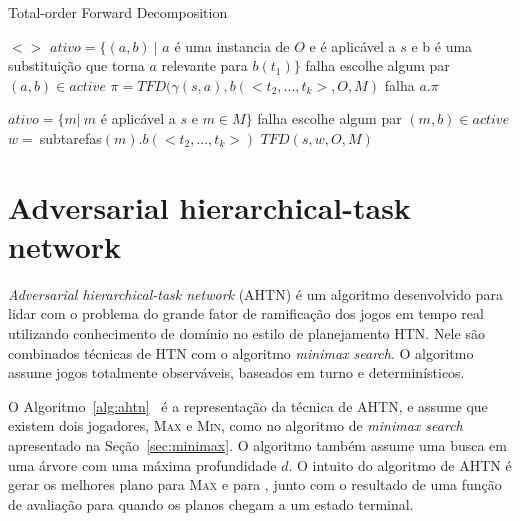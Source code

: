 \begin{algorithm}
	\caption{Total-order Forward Decomposition}
	\label{alg:tfd}
	\begin{algorithmic}[1]		
				\State	\Return $<>$
			\EndIf
				\State $ativo = \{(a, b)~ |$ $a$ é uma instancia de $O$ e é aplicável a $s$ e b é uma substituição que torna $a$ relevante para $b(t_{1})\}$
					\State \Return falha
				\EndIf
				\State escolhe algum par $(a, b) \in active$
				\State $\pi = TFD(\gamma(s, a), b(<t_{2}, ..., t_{k}>, O, M)$
					\State \Return falha
				\Else 
					\State \Return $a . \pi$
			\EndIf
			
				\State $ativo = \{m |~ m$ é aplicável a $s$ e $m \in M\}$
					\State \Return falha
				\EndIf
				\State escolhe algum par $(m, b) \in active$
				\State $w =~ $subtarefas$(m).b(<t_{2}, ..., t_{k}>)$
				\State \Return $TFD(s, w, O, M)$
				\EndIf
		\EndFunction
	\end{algorithmic}
\end{algorithm}

\section{Adversarial hierarchical-task network} 

\textit{Adversarial hierarchical-task network} (AHTN) é um algoritmo desenvolvido para lidar com o problema do grande fator de ramificação dos jogos em tempo real~\cite{ontanon2015adversarial} utilizando conhecimento de domínio no estilo de planejamento HTN. 
Nele são combinados técnicas de HTN com o algoritmo \textit{minimax search}. 
O algoritmo assume jogos totalmente observáveis, baseados em turno e determinísticos. 

O Algoritmo~\ref{alg:ahtn}~\cite{ontanon2015adversarial} é a representação da técnica de AHTN, e assume que existem dois jogadores, \textsc{Max} e \textsc{Min}, como no algoritmo de \textit{minimax search} apresentado na Seção~\ref{sec:minimax}. 
O algoritmo também assume uma busca em uma árvore com uma máxima profundidade $d$. 
O intuito do algoritmo de AHTN é gerar os melhores plano para \textsc{Max} e para , junto com o resultado de uma função de avaliação para quando os planos chegam a um estado terminal. 

